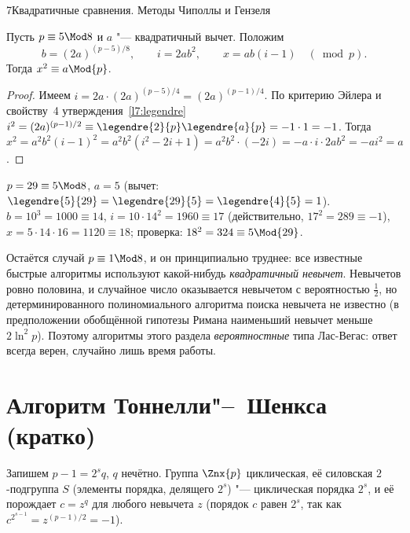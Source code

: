 \begin{lecture}{7}{Квадратичные сравнения. Методы Чиполлы и Гензеля}

\begin{proposition}\label{l7:atkin}
Пусть $p \equiv 5 \Mod 8$ и $a$ "--- квадратичный вычет. Положим
\[
  b = (2a)^{(p-5)/8}, \qquad i = 2ab^2, \qquad x = ab(i - 1) \quad(\bmod p).
\]
Тогда $x^2 \equiv a \Mod{p}$.
\end{proposition}

\begin{proof}
Имеем $i = 2a \cdot (2a)^{(p-5)/4} = (2a)^{(p-1)/4}$. По критерию Эйлера и
свойству~4 утверждения~\ref{l7:legendre} $i^2 = (2a)^{(p-1)/2} \equiv
\legendre{2}{p}\legendre{a}{p} = -1 \cdot 1 = -1$. Тогда
$x^2 = a^2 b^2 (i - 1)^2 = a^2 b^2 (i^2 - 2i + 1) = a^2 b^2 \cdot (-2i) = -a \cdot i \cdot 2ab^2
= -a i^2 = a$.
\end{proof}

\begin{example}
$p = 29 \equiv 5 \Mod 8$, $a = 5$ (вычет: $\legendre{5}{29} = \legendre{29}{5} = \legendre{4}{5} = 1$).
$b = 10^{3} = 1000 \equiv 14$, $i = 10 \cdot 14^2 = 1960 \equiv 17$ (действительно,
$17^2 = 289 \equiv -1$), $x = 5 \cdot 14 \cdot 16 = 1120 \equiv 18$; проверка:
$18^2 = 324 \equiv 5 \Mod{29}$.
\end{example}

Остаётся случай $p \equiv 1 \Mod 8$, и он принципиально труднее: все известные быстрые
алгоритмы используют какой-нибудь \emph{квадратичный невычет}. Невычетов ровно половина, и
случайное число оказывается невычетом с вероятностью $\frac12$, но детерминированного
полиномиального алгоритма поиска невычета не известно (в предположении обобщённой гипотезы
Римана наименьший невычет меньше $2\ln^2 p$). Поэтому алгоритмы этого раздела
\emph{вероятностные} типа Лас-Вегас: ответ всегда верен, случайно лишь время работы.


\section{Алгоритм Тоннелли"--~Шенкса (кратко)}\label{l7:sec-ts}

Запишем $p - 1 = 2^s q$, $q$ нечётно. Группа $\Znx{p}$ циклическая, её силовская
$2$-подгруппа $S$ (элементы порядка, делящего $2^s$) "--- циклическая порядка $2^s$, и её
порождает $c = z^q$ для любого невычета $z$ (порядок $c$ равен $2^s$, так как
$c^{2^{s-1}} = z^{(p-1)/2} = -1$).


\end{lecture}
